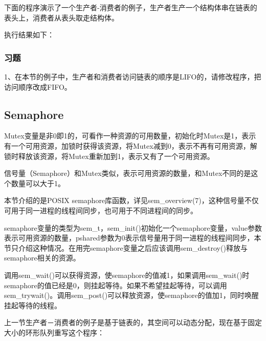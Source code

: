 下面的程序演示了一个生产者-消费者的例子，生产者生产一个结构体串在链表的表头上，消费者从表头取走结构体。




执行结果如下：



\subsubsection*{习题}
%


1、在本节的例子中，生产者和消费者访问链表的顺序是LIFO的，请修改程序，把访问顺序改成FIFO。


\subsection{Semaphore}
%


Mutex变量是非0即1的，可看作一种资源的可用数量，初始化时Mutex是1，表示有一个可用资源，加锁时获得该资源，将Mutex减到0，表示不再有可用资源，解锁时释放该资源，将Mutex重新加到1，表示又有了一个可用资源。



信号量（Semaphore）和Mutex类似，表示可用资源的数量，和Mutex不同的是这个数量可以大于1。



本节介绍的是POSIX semaphore库函数，详见sem\_\BookSplit{}overview(7)，这种信号量不仅可用于同一进程的线程间同步，也可用于不同进程间的同步。




semaphore变量的类型为sem\_\BookSplit{}t，sem\_\BookSplit{}init()初始化一个semaphore变量，value参数表示可用资源的数量，pshared参数为0表示信号量用于同一进程的线程间同步，本节只介绍这种情况。在用完semaphore变量之后应该调用sem\_\BookSplit{}destroy()释放与semaphore相关的资源。



调用sem\_\BookSplit{}wait()可以获得资源，使semaphore的值减1，如果调用sem\_\BookSplit{}wait()时semaphore的值已经是0，则挂起等待。如果不希望挂起等待，可以调用sem\_\BookSplit{}trywait()。调用sem\_\BookSplit{}post()可以释放资源，使semaphore的值加1，同时唤醒挂起等待的线程。



上一节生产者－消费者的例子是基于链表的，其空间可以动态分配，现在基于固定大小的环形队列重写这个程序：


